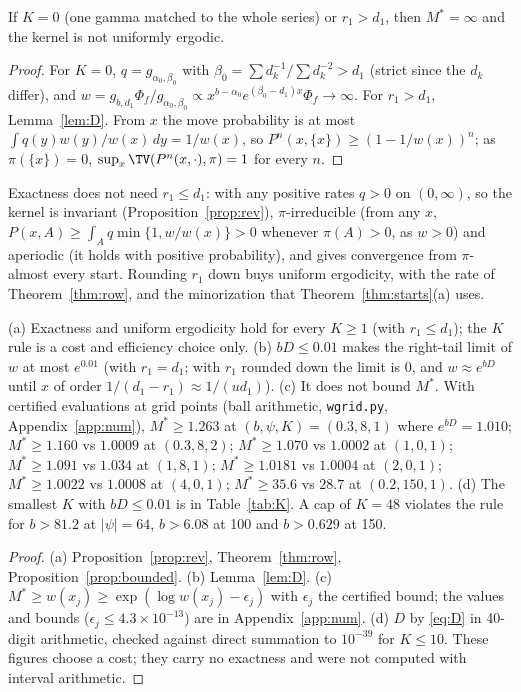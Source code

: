 \begin{proposition}\label{prop:K0}
If $K=0$ (one gamma matched to the whole series) or $r_1>d_1$, then $M^*=\infty$ and the kernel is not uniformly
ergodic.
\end{proposition}
\begin{proof}
For $K=0$, $q=g_{\alpha_0,\beta_0}$ with $\beta_0=\sum d_k^{-1}/\sum d_k^{-2}>d_1$ (strict since the $d_k$ differ),
and $w=g_{b,d_1}\Phi_f/g_{\alpha_0,\beta_0}\propto x^{b-\alpha_0}e^{(\beta_0-d_1)x}\Phi_f\to\infty$. For
$r_1>d_1$, Lemma~\ref{lem:D}. From $x$ the move probability is at most $\int q(y)w(y)/w(x)\,dy=1/w(x)$, so
$P^n(x,\{x\})\ge(1-1/w(x))^n$; as $\pi(\{x\})=0$, $\sup_x\TV(P^n(x,\cdot),\pi)=1$ for every $n$.
\end{proof}
\begin{remark}\label{rem:r1}
Exactness does not need $r_1\le d_1$: with any positive rates $q>0$ on $(0,\infty)$, so the kernel is invariant
(Proposition~\ref{prop:rev}), $\pi$-irreducible (from any $x$, $P(x,A)\ge\int_Aq\min\{1,w/w(x)\}>0$ whenever
$\pi(A)>0$, as $w>0$) and aperiodic (it holds with positive probability), and \cite[Thm.~4]{rr} gives convergence
from $\pi$-almost every start. Rounding $r_1$ down buys uniform ergodicity, with the rate of
Theorem~\ref{thm:row}, and the minorization that Theorem~\ref{thm:starts}(a) uses.
\end{remark}

\begin{proposition}\label{prop:Krule}
(a) Exactness and uniform ergodicity hold for every $K\ge1$ (with $r_1\le d_1$); the $K$ rule is a cost and
efficiency choice only. (b) $bD\le0.01$ makes the right-tail limit of $w$ at most $e^{0.01}$ (with $r_1=d_1$;
with $r_1$ rounded down the limit is 0, and $w\approx e^{bD}$ until $x$ of order $1/(d_1-r_1)\approx1/(ud_1)$).
(c) It does not bound $M^*$. With certified evaluations at grid points (ball arithmetic, \texttt{wgrid.py},
Appendix~\ref{app:num}), $M^*\ge1.263$ at $(b,\psi,K)=(0.3,8,1)$ where $e^{bD}=1.010$; $M^*\ge1.160$ vs $1.0009$ at
$(0.3,8,2)$; $M^*\ge1.070$ vs $1.0002$ at $(1,0,1)$; $M^*\ge1.091$ vs $1.034$ at $(1,8,1)$; $M^*\ge1.0181$ vs
$1.0004$ at $(2,0,1)$; $M^*\ge1.0022$ vs $1.0008$ at $(4,0,1)$; $M^*\ge35.6$ vs $28.7$ at $(0.2,150,1)$. (d) The smallest $K$ with $bD\le0.01$ is in Table~\ref{tab:K}. A cap of
$K=48$ violates the rule for $b>81.2$ at $|\psi|=64$, $b>6.08$ at 100 and $b>0.629$ at 150.
\end{proposition}
\begin{proof}
(a) Proposition~\ref{prop:rev}, Theorem~\ref{thm:row}, Proposition~\ref{prop:bounded}. (b) Lemma~\ref{lem:D}.
(c) $M^*\ge w(x_j)\ge\exp(\log\hat w(x_j)-\epsilon_j)$ with $\epsilon_j$ the certified bound; the values and bounds
($\epsilon_j\le4.3\times10^{-13}$) are in Appendix~\ref{app:num}. (d) $D$ by \eqref{eq:D} in 40-digit
arithmetic, checked against direct summation to $10^{-39}$ for $K\le10$. These figures choose a cost; they carry
no exactness and were not computed with interval arithmetic.
\end{proof}

